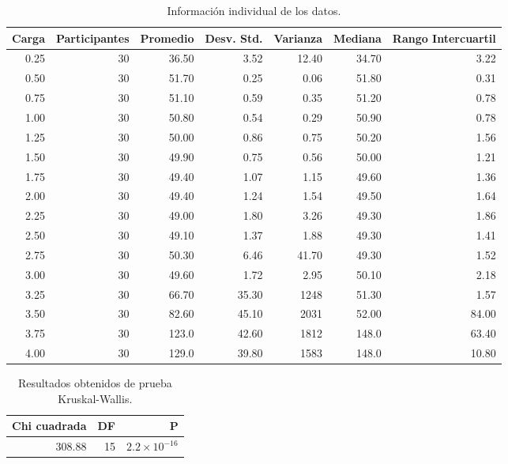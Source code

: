 \documentclass{article}
\begin{document}
\begin{table}[htbp]
    \centering
    \caption{Informaci\'on individual de los datos.} 
    \begin{tabular}{|r|r|r|r|r|r|r|}
    \hline
    Carga & Participantes & Promedio & Desv. Std. & Varianza & Mediana & Rango Intercuartil  \\
    \hline
    0.25 & 30 & 36.50 & 3.52 & 12.40 & 34.70 & 3.22 \\
    \hline
    0.50 & 30 & 51.70 & 0.25 & 0.06 & 51.80 & 0.31 \\
    \hline
    0.75 & 30 & 51.10 & 0.59 & 0.35 & 51.20 & 0.78 \\
    \hline
    1.00 & 30 & 50.80 & 0.54 & 0.29 & 50.90 & 0.78 \\
    \hline
    1.25 & 30 & 50.00 & 0.86 & 0.75 & 50.20 & 1.56 \\
    \hline
    1.50 & 30 & 49.90 & 0.75 & 0.56 & 50.00 & 1.21 \\
    \hline
    1.75 & 30 & 49.40 & 1.07 & 1.15 & 49.60 & 1.36 \\
    \hline
    2.00 & 30 & 49.40 & 1.24 & 1.54 & 49.50 & 1.64 \\
    \hline
    2.25 & 30 & 49.00 & 1.80 & 3.26 & 49.30 & 1.86 \\
    \hline
    2.50 & 30 & 49.10 & 1.37 & 1.88 & 49.30 & 1.41 \\
    \hline
    2.75 & 30 & 50.30 & 6.46 & 41.70 & 49.30 & 1.52 \\
    \hline
    3.00 & 30 & 49.60 & 1.72 & 2.95 & 50.10 & 2.18 \\
    \hline
    3.25 & 30 & 66.70 & 35.30 & 1248 & 51.30 & 1.57 \\
    \hline
    3.50 & 30 & 82.60 & 45.10 & 2031 & 52.00 & 84.00 \\
    \hline
    3.75 & 30 & 123.0 & 42.60 & 1812 & 148.0 & 63.40 \\
    \hline
    4.00 & 30 & 129.0 & 39.80 & 1583 & 148.0 & 10.80 \\
    \hline
\end{tabular}
    \label{cuadro 2}
\end{table}



\begin{table}[htbp]
    \centering
    \caption{Resultados obtenidos de prueba Kruskal-Wallis.} 
    \begin{tabular}{|r|r|r|}
    \hline
    Chi cuadrada & DF & P  \\
    \hline
    308.88 & 15 & $2.2\times 10^{-16}$ \\
    \hline
\end{tabular}
    \label{cuadro 3}
\end{table}
\end{document}
